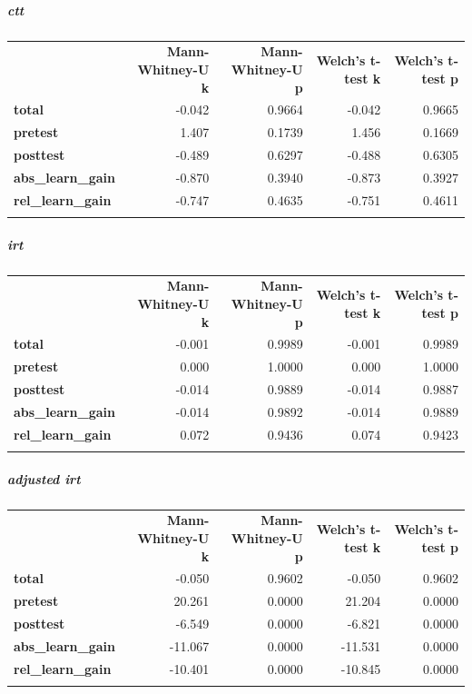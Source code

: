 \documentclass[]{article}
\begin{document}
\FloatBarrier
\subparagraph{ctt}\label{ctt}

\begin{longtable}[c]{@{}lrrrr@{}}
\toprule\addlinespace
& \textbf{Mann-Whitney-U k} & \textbf{Mann-Whitney-U p} &
\textbf{Welch's t-test k} & \textbf{Welch's t-test p}
\\\addlinespace
\midrule\endhead
\textbf{total} & -0.042 & 0.9664 & -0.042 & 0.9665
\\\addlinespace
\textbf{pretest} & 1.407 & 0.1739 & 1.456 & 0.1669
\\\addlinespace
\textbf{posttest} & -0.489 & 0.6297 & -0.488 & 0.6305
\\\addlinespace
\textbf{abs\_learn\_gain} & -0.870 & 0.3940 & -0.873 & 0.3927
\\\addlinespace
\textbf{rel\_learn\_gain} & -0.747 & 0.4635 & -0.751 & 0.4611
\\\addlinespace
\bottomrule
\end{longtable}

\FloatBarrier
\subparagraph{irt}\label{irt}

\begin{longtable}[c]{@{}lrrrr@{}}
\toprule\addlinespace
& \textbf{Mann-Whitney-U k} & \textbf{Mann-Whitney-U p} &
\textbf{Welch's t-test k} & \textbf{Welch's t-test p}
\\\addlinespace
\midrule\endhead
\textbf{total} & -0.001 & 0.9989 & -0.001 & 0.9989
\\\addlinespace
\textbf{pretest} & 0.000 & 1.0000 & 0.000 & 1.0000
\\\addlinespace
\textbf{posttest} & -0.014 & 0.9889 & -0.014 & 0.9887
\\\addlinespace
\textbf{abs\_learn\_gain} & -0.014 & 0.9892 & -0.014 & 0.9889
\\\addlinespace
\textbf{rel\_learn\_gain} & 0.072 & 0.9436 & 0.074 & 0.9423
\\\addlinespace
\bottomrule
\end{longtable}

\FloatBarrier
\subparagraph{adjusted irt}\label{adjusted-irt}

\begin{longtable}[c]{@{}lrrrr@{}}
\toprule\addlinespace
& \textbf{Mann-Whitney-U k} & \textbf{Mann-Whitney-U p} &
\textbf{Welch's t-test k} & \textbf{Welch's t-test p}
\\\addlinespace
\midrule\endhead
\textbf{total} & -0.050 & 0.9602 & -0.050 & 0.9602
\\\addlinespace
\textbf{pretest} & 20.261 & 0.0000 & 21.204 & 0.0000
\\\addlinespace
\textbf{posttest} & -6.549 & 0.0000 & -6.821 & 0.0000
\\\addlinespace
\textbf{abs\_learn\_gain} & -11.067 & 0.0000 & -11.531 & 0.0000
\\\addlinespace
\textbf{rel\_learn\_gain} & -10.401 & 0.0000 & -10.845 & 0.0000
\\\addlinespace
\bottomrule
\end{longtable}
\end{document}

